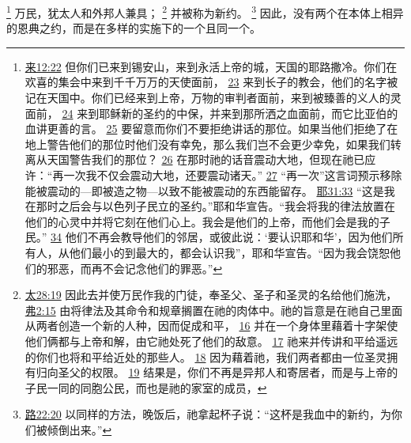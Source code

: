\documentclass[12pt, a4paper, oneside]{ctexart}
\begin{document}
	\footnote {
		\href{https://biblehub.com/hebrews/12-22.htm}{来12:22} 但你们已来到锡安山，来到永活上帝的城，天国的耶路撒冷。你们在欢喜的集会中来到千千万万的天使面前，
		\href{https://biblehub.com/hebrews/12-23.htm}{23} 来到长子的教会，他们的名字被记在天国中。你们已经来到上帝，万物的审判者面前，来到被臻善的义人的灵面前，
		\href{https://biblehub.com/hebrews/12-24.htm}{24} 来到耶稣新的圣约的中保，并来到那所洒之血面前，而它比亚伯的血讲更善的言。
		\href{https://biblehub.com/hebrews/12-25.htm}{25} 要留意而你们不要拒绝讲话的那位。如果当他们拒绝了在地上警告他们的那位时他们没有幸免，那么我们岂不会更少幸免，如果我们转离从天国警告我们的那位？
		\href{https://biblehub.com/hebrews/12-26.htm}{26} 在那时祂的话音震动大地，但现在祂已应许：“再一次我不仅会震动大地，还要震动诸天。”
		\href{https://biblehub.com/hebrews/12-27.htm}{27} “再一次”这言词预示移除能被震动的---即被造之物---以致不能被震动的东西能留存。
		\href{https://biblehub.com/jeremiah/31-33.htm}{耶31:33} “这是我在那时之后会与以色列子民立的圣约。”耶和华宣告。“我会将我的律法放置在他们的心灵中并将它刻在他们心上。我会是他们的上帝，而他们会是我的子民。”
		\href{https://biblehub.com/jeremiah/31-34.htm}{34} 他们不再会教导他们的邻居，或彼此说：‘要认识耶和华’，因为他们所有人，从他们最小的到最大的，都会认识我”，耶和华宣告。“因为我会饶恕他们的邪恶，而再不会记念他们的罪恶。”	
	}
	万民，犹太人和外邦人兼具；
	\footnote {
		\href{https://biblehub.com/matthew/28-19.htm}{太28:19} 因此去并使万民作我的门徒，奉圣父、圣子和圣灵的名给他们施洗，
		\href{https://biblehub.com/ephesians/2-15.htm}{弗2:15} 由将律法及其命令和规章搁置在祂的肉体中。祂的旨意是在祂自己里面从两者创造一个新的人种，因而促成和平，
		\href{https://biblehub.com/ephesians/2-16.htm}{16} 并在一个身体里藉着十字架使他们俩都与上帝和解，由它祂处死了他们的敌意。
		\href{https://biblehub.com/ephesians/2-17.htm}{17} 祂来并传讲和平给遥远的你们也将和平给近处的那些人。
		\href{https://biblehub.com/ephesians/2-18.htm}{18} 因为藉着祂，我们两者都由一位圣灵拥有归向圣父的权限。
		\href{https://biblehub.com/ephesians/2-19.htm}{19} 结果是，你们不再是异邦人和寄居者，而是与上帝的子民一同的同胞公民，而也是祂的家室的成员，
	}
	并被称为新约。
	\footnote {
		\href{https://biblehub.com/luke/22-20.htm}{路22:20} 以同样的方法，晚饭后，祂拿起杯子说：“这杯是我血中的新约，为你们被倾倒出来。”
	}
	因此，没有两个在本体上相异的恩典之约，而是在多样的实施下的一个且同一个。
\end{document}
